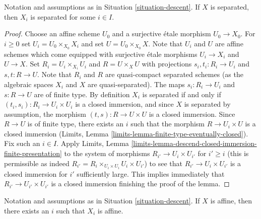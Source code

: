 \begin{lemma}
\label{lemma-descend-separated}
Notation and assumptions as in Situation \ref{situation-descent}.
If $X$ is separated, then $X_i$ is separated for some $i \in I$.
\end{lemma}

\begin{proof}
Choose an affine scheme $U_0$ and a surjective \'etale morphism $U_0 \to X_0$.
For $i \geq 0$ set $U_i = U_0 \times_{X_0} X_i$ and set
$U = U_0 \times_{X_0} X$. Note that $U_i$ and $U$ are affine schemes
which come equipped with surjective \'etale morphisms $U_i \to X_i$
and $U \to X$. Set $R_i = U_i \times_{X_i} U_i$ and $R = U \times_X U$
with projections $s_i, t_i : R_i \to U_i$ and $s, t : R \to U$.
Note that $R_i$ and $R$ are quasi-compact separated schemes (as the
algebraic spaces $X_i$ and $X$ are quasi-separated). The maps
$s_i : R_i \to U_i$ and $s : R \to U$ are of finite type.
By definition $X_i$ is separated if and only if
$(t_i, s_i) : R_i \to U_i \times U_i$
is a closed immersion, and since $X$ is separated by assumption,
the morphism $(t, s) : R \to U \times U$ is a closed immersion. Since
$R \to U$ is of finite type, there exists an
$i$ such that the morphism $R \to U_i \times U$ is a closed immersion
(Limits, Lemma \ref{limits-lemma-finite-type-eventually-closed}).
Fix such an $i \in I$. Apply Limits, Lemma
\ref{limits-lemma-descend-closed-immersion-finite-presentation}
to the system of morphisms $R_{i'} \to U_i \times U_{i'}$ for $i' \geq i$
(this is permissible as indeed
$R_{i'} = R_i \times_{U_i \times U_i} U_i \times U_{i'}$)
to see that $R_{i'} \to U_i \times U_{i'}$ is a closed immersion
for $i'$ sufficiently large. This implies immediately
that $R_{i'} \to U_{i'} \times U_{i'}$ is a closed immersion
finishing the proof of the lemma.
\end{proof}

\begin{lemma}
\label{lemma-limit-is-affine}
Notation and assumptions as in Situation \ref{situation-descent}.
If $X$ is affine, then there exists an $i$ such that $X_i$ is affine.
\end{lemma}

